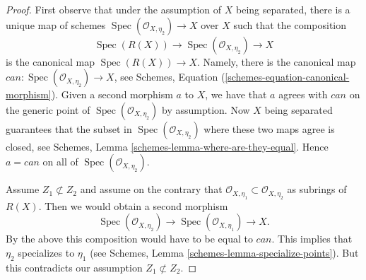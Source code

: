 \documentclass[10pt,a4paper]{amsart}
\theoremstyle{plain}
\theoremstyle{definition}
\theoremstyle{remark}
\numberwithin{equation}{subsection}
\def\Spec{\mathop{\mathrm{Spec}}}
\begin{document}
\begin{proof}
First observe that under the assumption of $X$ being separated,
there is a unique map of schemes
$\Spec(\mathcal{O}_{X, \eta_2}) \to X$ over $X$
such that the composition
$$
\Spec(R(X)) \longrightarrow
\Spec(\mathcal{O}_{X, \eta_2}) \longrightarrow X
$$
is the canonical map $\Spec(R(X)) \to X$.
Namely, there is the canonical map
$can : \Spec(\mathcal{O}_{X, \eta_2}) \to X$, see
Schemes, Equation (\ref{schemes-equation-canonical-morphism}).
Given a second morphism $a$ to $X$, we have that $a$ agrees with $can$
on the generic point of
$\Spec(\mathcal{O}_{X, \eta_2})$ by assumption.
Now $X$ being separated guarantees that the subset in
$\Spec(\mathcal{O}_{X, \eta_2})$ where
these two maps agree is closed, see
Schemes, Lemma \ref{schemes-lemma-where-are-they-equal}.
Hence $a = can$ on all of $\Spec(\mathcal{O}_{X, \eta_2})$.

\medskip\noindent
Assume $Z_1 \not \subset Z_2$ and assume on the contrary that
$\mathcal{O}_{X, \eta_{1}} \subset \mathcal{O}_{X, \eta_{2}}$
as subrings of $R(X)$. Then we would obtain a second morphism
$$
\Spec(\mathcal{O}_{X, \eta_{2}}) \longrightarrow
\Spec(\mathcal{O}_{X, \eta_{1}}) \longrightarrow
X.
$$
By the above this composition would have to be equal to $can$.
This implies that $\eta_2$ specializes to $\eta_1$ (see
Schemes, Lemma \ref{schemes-lemma-specialize-points}).
But this contradicts our assumption $Z_1 \not \subset Z_2$.
\end{proof}
\end{document}
